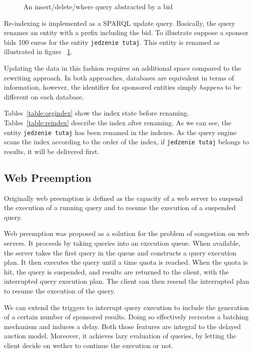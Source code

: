 \documentclass[runningheads]{llncs}
\begin{document}
\begin{figure}
  
  \caption{An insert/delete/where query abstracted by a bid}
  \label{algo:update}
\end{figure}


Re-indexing is implemented as a SPARQL update query.
Basically, the query renames an entity with a prefix including the bid. To illustrate suppose a sponsor bids 100 euros for the entity
\verb+jedzenie tutaj+. This entity is renamed as  illustrated in figure ~\ref{algo:update}.

Updating the data in this fashion requires  an additional space compared
to the rewriting approach. In both approaches,  databases are equivalent in terms
of information, however, the identifier for sponsored entities simply
\textit{happens} to be different on each database.

Tables~\ref{table:orgindex} show the index
state before renaming. Tables~\ref{table:reindex} describe
the index after renaming. As we can see, the entity
\verb+jedzenie tutaj+ has been renamed in the  indexes. As the query
engine scans the index according to the order of the index, if
\verb+jedzenie tutaj+ belongs to results, it will be delivered first.

\subsection{Web Preemption}

Originally web preemption\cite{DBLP:conf/www/MinierSM19} is defined as
the capacity of a web server to suspend the execution of a running query
and to resume the execution of a suspended query.

Web preemption was proposed as a solution for the problem of
congestion on web servers.  It proceeds by taking queries into an
execution queue. When available, the server takes the first query in
the queue and constructs a  query execution plan. It then executes the query
until a time quota is reached. When the quota is hit, the query is
suspended, and results are returned to the client, with the
interrupted query execution plan. The client can then resend the
interrupted plan to resume the execution of the query.

We can extend the triggers to interrupt query execution to include the
generation of a certain number of sponsored results. Doing so
effectively recreates a batching mechanism and induces a delay. Both
those features are integral to the delayed auction model.  Moreover,
it achieves lazy evaluation of queries, by letting the client decide
on wether to continue the execution or not.
\end{document}
